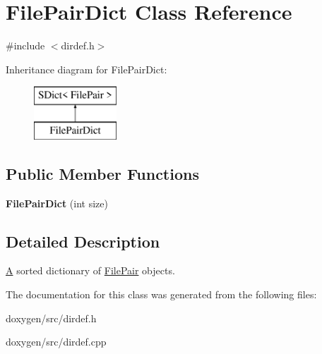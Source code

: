 \hypertarget{class_file_pair_dict}{}\section{File\+Pair\+Dict Class Reference}
\label{class_file_pair_dict}


{\ttfamily \#include $<$dirdef.\+h$>$}

Inheritance diagram for File\+Pair\+Dict\+:\begin{figure}[H]
\begin{center}
\leavevmode
\includegraphics[height=2.000000cm]{class_file_pair_dict}
\end{center}
\end{figure}
\subsection*{Public Member Functions}
\begin{DoxyCompactItemize}
\item 
\mbox{\label{class_file_pair_dict_a52abd793de132f4b4c8716153965dce3}} 
{\bfseries File\+Pair\+Dict} (int size)
\end{DoxyCompactItemize}


\subsection{Detailed Description}
\mbox{\hyperlink{class_a}{A}} sorted dictionary of \mbox{\hyperlink{class_file_pair}{File\+Pair}} objects. 

The documentation for this class was generated from the following files\+:\begin{DoxyCompactItemize}
\item 
doxygen/src/dirdef.\+h\item 
doxygen/src/dirdef.\+cpp\end{DoxyCompactItemize}
